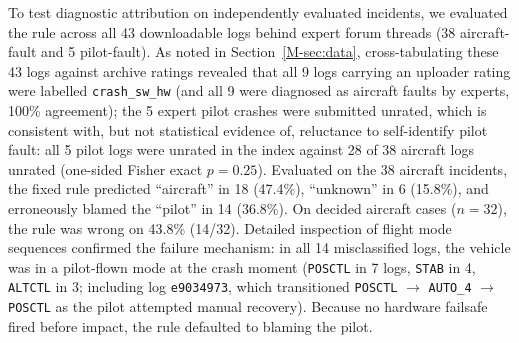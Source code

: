 \documentclass[preprint,12pt]{elsarticle}
\begin{document}
To test diagnostic attribution on independently evaluated incidents, we evaluated the rule across all 43 downloadable logs behind
expert forum threads (38 aircraft-fault and 5 pilot-fault). As noted in Section~\ref{M-sec:data}, cross-tabulating these 43 logs against
archive ratings revealed that all 9 logs carrying an uploader rating were labelled \texttt{crash\_sw\_hw} (and all 9 were diagnosed as aircraft
faults by experts, 100\% agreement); the 5 expert pilot crashes were submitted unrated, which is consistent with, but not statistical
evidence of, reluctance to self-identify pilot fault: all 5 pilot logs were unrated in the index against 28 of 38 aircraft logs unrated
(one-sided Fisher exact $p=0.25$). Evaluated on the 38 aircraft incidents, the fixed rule predicted ``aircraft'' in 18 (47.4\%),
``unknown'' in 6 (15.8\%), and erroneously blamed the ``pilot'' in 14 (36.8\%). On decided aircraft cases ($n=32$), the rule was wrong on
43.8\% (14/32). Detailed inspection of flight mode sequences confirmed the failure mechanism: in all 14 misclassified logs, the vehicle was
in a pilot-flown mode at the crash moment (\texttt{POSCTL} in 7 logs, \texttt{STAB} in 4, \texttt{ALTCTL} in 3; including log \texttt{e9034973},
which transitioned \texttt{POSCTL} $\to$ \texttt{AUTO\_4} $\to$ \texttt{POSCTL} as the pilot attempted manual recovery). Because no hardware
failsafe fired before impact, the rule defaulted to blaming the pilot.
\end{document}
